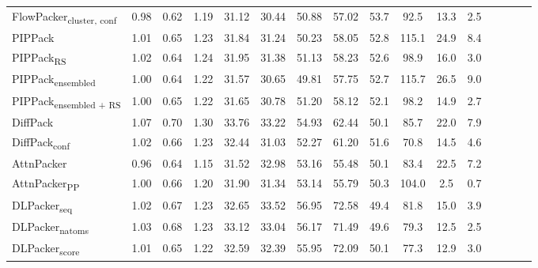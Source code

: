 \begin{table}
{\begin{tabular}{@{}lccccccccccccccc@{}}
                \textnormal{\hspace{0.5cm}FlowPacker\textsubscript{cluster, conf}} & 0.98 & 0.62 & 1.19 & 31.12 & 30.44 & 50.88 & 57.02 & 53.7 & 92.5 & 13.3 & 2.5 \\
                \textnormal{\hspace{0.5cm}PIPPack} & 1.01 & 0.65 & 1.23 & 31.84 & 31.24 & 50.23 & 58.05 & 52.8 & 115.1 & 24.9 & 8.4 \\
                \textnormal{\hspace{0.5cm}PIPPack\textsubscript{RS}} & 1.02 & 0.64 & 1.24 & 31.95 & 31.38 & 51.13 & 58.23 & 52.6 & 98.9 & 16.0 & 3.0 \\
                \textnormal{\hspace{0.5cm}PIPPack\textsubscript{ensembled}} & 1.00 & 0.64 & 1.22 & 31.57 & 30.65 & 49.81 & 57.75 & 52.7 & 115.7 & 26.5 & 9.0 \\
                \textnormal{\hspace{0.5cm}PIPPack\textsubscript{ensembled + RS}} & 1.00 & 0.65 & 1.22 & 31.65 & 30.78 & 51.20 & 58.12 & 52.1 & 98.2 & 14.9 & 2.7 \\
                \textnormal{\hspace{0.5cm}DiffPack} & 1.07 & 0.70 & 1.30 & 33.76 & 33.22 & 54.93 & 62.44 & 50.1 & 85.7 & 22.0 & 7.9 \\
                \textnormal{\hspace{0.5cm}DiffPack\textsubscript{conf}} & 1.02 & 0.66 & 1.23 & 32.44 & 31.03 & 52.27 & 61.20 & 51.6 & 70.8 & 14.5 & 4.6 \\
                \textnormal{\hspace{0.5cm}AttnPacker} & 0.96 & 0.64 & 1.15 & 31.52 & 32.98 & 53.16 & 55.48 & 50.1 & 83.4 & 22.5 & 7.2 \\
                \textnormal{\hspace{0.5cm}AttnPacker\textsubscript{PP}} & 1.00 & 0.66 & 1.20 & 31.90 & 31.34 & 53.14 & 55.79 & 50.3 & 104.0 & 2.5 & 0.7 \\
                \textnormal{\hspace{0.5cm}DLPacker\textsubscript{seq}} & 1.02 & 0.67 & 1.23 & 32.65 & 33.52 & 56.95 & 72.58 & 49.4 & 81.8 & 15.0 & 3.9 \\
                \textnormal{\hspace{0.5cm}DLPacker\textsubscript{natoms}} & 1.03 & 0.68 & 1.23 & 33.12 & 33.04 & 56.17 & 71.49 & 49.6 & 79.3 & 12.5 & 2.5 \\
                \textnormal{\hspace{0.5cm}DLPacker\textsubscript{score}} & 1.01 & 0.65 & 1.22 & 32.59 & 32.39 & 55.95 & 72.09 & 50.1 & 77.3 & 12.9 & 3.0 \\

\end{tabular}}
\end{table}
